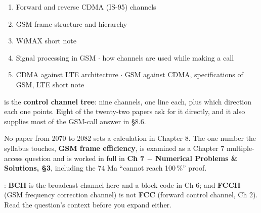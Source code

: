 {\begin{enumerate}
  \item Forward and reverse CDMA (IS-95) channels 
  \item GSM frame structure and hierarchy 
  \item WiMAX short note 
  \item Signal processing in GSM  \gap$\cdot$\gap
        how channels are used while making a call 
  \item CDMA against LTE architecture  \gap$\cdot$\gap
        GSM against CDMA, specifications of GSM, LTE short note
\end{enumerate}
\vspace{2pt}
{\color{sub}\footnotesize {} is the
\textbf{control channel tree}: nine channels, one line each, plus which direction each one
points. Eight of the twenty-two papers ask for it directly, and it also supplies most of the
GSM-call answer in \S8.6.}

\vspace{2pt}
{\color{sub}\footnotesize {} No paper from 2070 to
2082 sets a calculation in Chapter 8. The one number the syllabus touches, \textbf{GSM frame
efficiency}, is examined as a Chapter 7 multiple-access question and is worked in full in
\textbf{Ch 7 $-$ Numerical Problems \& Solutions, \S3}, including the 74 Ma
``cannot reach 100\,\%'' proof.}

\vspace{2pt}
{\color{sub}\footnotesize {}: \textbf{BCH} is the broadcast
channel here and a block code in Ch 6; and \textbf{FCCH} (GSM frequency correction channel)
is not \textbf{FCC} (forward control channel, Ch 2). Read the question's context before you
expand either.}}
